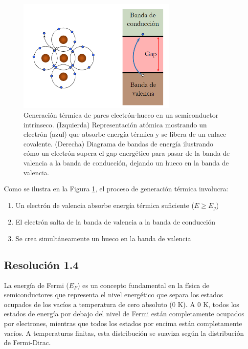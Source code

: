 \documentclass[
  11pt,
  letterpaper,
   addpoints,
   answers
  ]{exam}
\begin{document}
\begin{questions}
\begin{solution}
\begin{figure}[H]
    \centering
    \includegraphics[width=0.7\textwidth]{../figures/Auxiliar_2_4}
    \caption{Generación térmica de pares electrón-hueco en un semiconductor intrínseco. (Izquierda) Representación atómica mostrando un electrón (azul) que absorbe energía térmica y se libera de un enlace covalente. (Derecha) Diagrama de bandas de energía ilustrando cómo un electrón supera el gap energético para pasar de la banda de valencia a la banda de conducción, dejando un hueco en la banda de valencia.}
    \label{fig:generacion_termica}
\end{figure}

Como se ilustra en la Figura \ref{fig:generacion_termica}, el proceso de generación térmica involucra:
\begin{enumerate}
    \item Un electrón de valencia absorbe energía térmica suficiente ($E \geq E_g$)
    \item El electrón salta de la banda de valencia a la banda de conducción
    \item Se crea simultáneamente un hueco en la banda de valencia
\end{enumerate}



\subsection*{Resolución 1.4}
La energía de Fermi ($E_F$) es un concepto fundamental en la física de semiconductores que representa el nivel energético que separa los estados ocupados de los vacíos a temperatura de cero absoluto (0 K). A 0 K, todos los estados de energía por debajo del nivel de Fermi están completamente ocupados por electrones, mientras que todos los estados por encima están completamente vacíos. A temperaturas finitas, esta distribución se suaviza según la distribución de Fermi-Dirac.


\end{solution}
\end{questions}
\end{document}
